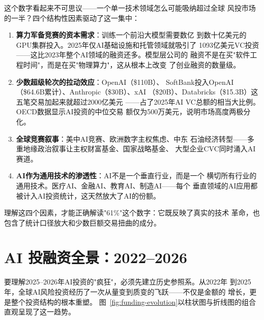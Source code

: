 \begin{whybox}
这个数字看起来不可思议——一个单一技术领域怎么可能吸纳超过全球
风投市场的一半？四个结构性因素驱动了这一集中：
\begin{enumerate}
  \item \textbf{算力军备竞赛的资本需求}：训练一个前沿大模型需要数亿
    到数十亿美元的GPU集群投入。2025年仅AI基础设施和托管领域就吸引了
    1093亿美元VC投资——这比2023年整个AI领域的融资还多。模型层公司的
    融资不是在买"软件工程时间"，而是在买"物理算力"，这从根本上改变
    了创业融资的数量级。
  \item \textbf{少数超级轮次的拉动效应}：OpenAI（\$110B）、
    SoftBank投入OpenAI（\$64.6B累计）、Anthropic（\$30B）、xAI
    （\$20B）、Databricks（\$15.3B）这五笔交易加起来就超过2000亿美元
    ——占了2025年AI VC总额的相当大比例。OECD数据显示AI投资的中位交易
    额仅为500万美元，说明市场高度两极分化。
  \item \textbf{全球竞赛叙事}：美中AI竞赛、欧洲数字主权焦虑、中东
    石油经济转型——多重地缘政治叙事让主权财富基金、国家战略基金、
    大型企业CVC同时涌入AI赛道。
  \item \textbf{AI作为通用技术的渗透性}：AI不是一个垂直行业，而是一个
    横切所有行业的通用技术。医疗AI、金融AI、教育AI、制造AI——每个
    垂直领域的AI应用都被计入AI投资统计，这天然放大了AI的份额。
\end{enumerate}
理解这四个因素，才能正确解读"61\%"这个数字：它既反映了真实的技术
革命，也包含了统计口径放大和少数巨额交易扭曲的成分。
\end{whybox}


\section{AI 投融资全景：2022--2026}
\label{sec:fund-overview}

要理解2025--2026年AI投资的"疯狂"，必须先建立历史参照系。从2022年
到2025年，全球AI风险投资经历了一次从量变到质变的飞跃——不仅是金额的
增长，更是整个投资结构的根本重塑。
图~\ref{fig:funding-evolution}以柱状图与折线图的组合直观呈现了这一趋势。

